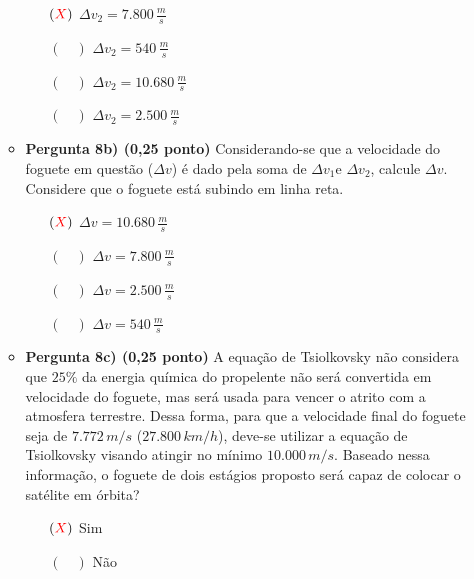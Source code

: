 \documentclass[a4paper, 12pt]{article}
\newcommand{\red}[1]{\textcolor{red}{#1}}
\begin{document}
\begin{flushleft}
\begin{itemize}
\begin{itemize}
\begin{itemize}
                        \item[$(\red{X})$] $\Delta v_2 = 7.800 \, \frac{m}{s}$
                        \item[$(\quad)$] $\Delta v_2 = 540 \, \frac{m}{s}$
                        \item[$(\quad)$] $\Delta v_2 = 10.680 \, \frac{m}{s}$
                        \item[$(\quad)$] $\Delta v_2 = 2.500 \, \frac{m}{s}$
                    \end{itemize}
                \item \textbf{Pergunta 8b) (0,25 ponto)} Considerando-se que a velocidade do foguete em questão ($\Delta v$) é dado pela soma de $\Delta v_1$e $\Delta v_2$, calcule $\Delta v$. Considere que o foguete está subindo em linha reta.
                    \begin{itemize}
                        \item[$(\red{X})$] $\Delta v = 10.680 \, \frac{m}{s}$
                        \item[$(\quad)$] $\Delta v = 7.800 \, \frac{m}{s}$
                        \item[$(\quad)$] $\Delta v = 2.500 \, \frac{m}{s}$
                        \item[$(\quad)$] $\Delta v = 540 \, \frac{m}{s}$
                    \end{itemize}
                \item \textbf{Pergunta 8c) (0,25 ponto)} A equação de Tsiolkovsky não considera que $25\%$ da energia química do propelente não será convertida em velocidade do foguete, mas será usada para vencer o atrito com a atmosfera terrestre. Dessa forma, para que a velocidade final do foguete seja de $7.772 \, m/s$ ($27.800 \, km/h$), deve-se utilizar a equação de Tsiolkovsky visando atingir no mínimo $10.000 \, m/s$. Baseado nessa informação, o foguete de dois estágios proposto será capaz de colocar o satélite em órbita?
                    \begin{itemize}
                        \item[$(\red{X})$] Sim
                        \item[$(\quad)$] Não
                    \end{itemize}
            \end{itemize}
        

\end{itemize}
\end{flushleft}
\end{document}
